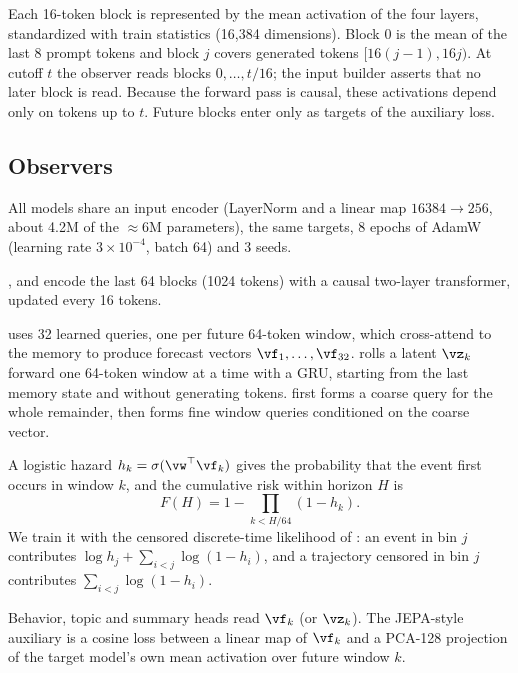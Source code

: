 Each 16-token block is represented by the mean activation of the four layers, standardized with train statistics (16{,}384 dimensions).
Block 0 is the mean of the last 8 prompt tokens and block $j$ covers generated tokens $[16(j-1), 16j)$.
At cutoff $t$ the observer reads blocks $0,\dots,t/16$; the input builder asserts that no later block is read.
Because the forward pass is causal, these activations depend only on tokens up to $t$.
Future blocks enter only as targets of the auxiliary loss.

\subsection{Observers}
\label{sec:observers}

All models share an input encoder (LayerNorm and a linear map $16384 \to 256$, about 4.2M of the $\approx$6M parameters), the same targets, 8 epochs of AdamW (learning rate $3\times10^{-4}$, batch 64) and 3 seeds.

\hq, \roll and \hier encode the last 64 blocks (1024 tokens) with a causal two-layer transformer, updated every 16 tokens.

\hq uses 32 learned queries, one per future 64-token window, which cross-attend to the memory to produce forecast vectors $\vf_1,\dots,\vf_{32}$.
\roll rolls a latent $\vz_k$ forward one 64-token window at a time with a GRU, starting from the last memory state and without generating tokens.
\hier first forms a coarse query for the whole remainder, then forms fine window queries conditioned on the coarse vector.

A logistic hazard $h_k = \sigma(\vw^\top \vf_k)$ gives the probability that the event first occurs in window $k$, and the cumulative risk within horizon $H$ is
\begin{equation}
F(H) = 1 - \prod_{k < H/64} (1 - h_k).
\label{eq:hazard}
\end{equation}
We train it with the censored discrete-time likelihood of \citet{gensheimer2019nnet}: an event in bin $j$ contributes $\log h_j + \sum_{i<j}\log(1-h_i)$, and a trajectory censored in bin $j$ contributes $\sum_{i<j}\log(1-h_i)$.

Behavior, topic and summary heads read $\vf_k$ (or $\vz_k$).
The JEPA-style auxiliary is a cosine loss between a linear map of $\vf_k$ and a PCA-128 projection of the target model's own mean activation over future window $k$.

